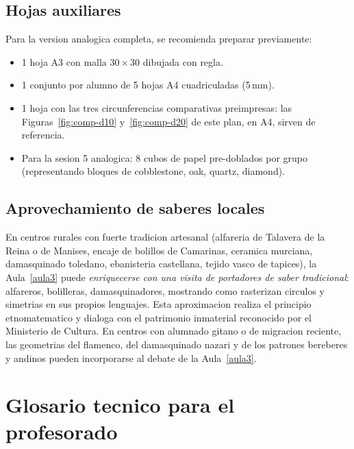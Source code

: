\documentclass[12pt,a4paper]{scrartcl}
\begin{document}
\subsection{Hojas auxiliares}
Para la version analogica completa, se recomienda preparar previamente:
\begin{itemize}[leftmargin=1.3em,itemsep=0.1em,topsep=0.2em,nosep]
  \item 1 hoja A3 con malla $30 \times 30$ dibujada con regla.
  \item 1 conjunto por alumno de 5 hojas A4 cuadriculadas (5\,mm).
  \item 1 hoja con las tres circunferencias comparativas preimpresas: las Figuras~\ref{fig:comp-d10} y~\ref{fig:comp-d20} de este plan, en A4, sirven de referencia.
  \item Para la sesion 5 analogica: 8 cubos de papel pre-doblados por grupo (representando bloques de cobblestone, oak, quartz, diamond).
\end{itemize}

\subsection{Aprovechamiento de saberes locales}
En centros rurales con fuerte tradicion artesanal (alfareria de Talavera de la Reina o de Manises, encaje de bolillos de Camarinas, ceramica murciana, damasquinado toledano, ebanisteria castellana, tejido vasco de tapices), la Aula~\ref{aula3} puede \emph{enriquecerse con una visita de portadores de saber tradicional}: alfareros, bolilleras, damasquinadores, mostrando como rasterizan circulos y simetrias en sus propios lenguajes. Esta aproximacion realiza el principio etnomatematico y dialoga con el patrimonio inmaterial reconocido por el Ministerio de Cultura. En centros con alumnado gitano o de migracion reciente, las geometrias del flamenco, del damasquinado nazari y de los patrones bereberes y andinos pueden incorporarse al debate de la Aula~\ref{aula3}.

\newpage
\section{Glosario tecnico para el profesorado}\label{ap:glos}
\end{document}
